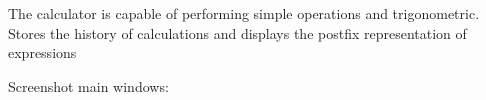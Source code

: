 The calculator is capable of performing simple operations and trigonometric. Stores the history of calculations and displays the postfix representation of expressions

Screenshot main windows\+: ~\newline
 

 

 